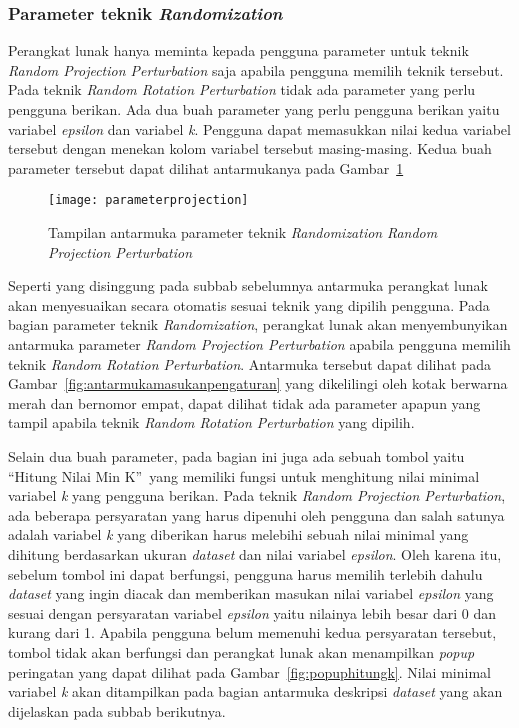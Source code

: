 \subsubsection{Parameter teknik \textit{Randomization}}
\label{subsubsec:parameterteknik}

Perangkat lunak hanya meminta kepada pengguna parameter untuk teknik \textit{Random Projection Perturbation} saja apabila pengguna memilih teknik tersebut. Pada teknik \textit{Random Rotation Perturbation} tidak ada parameter yang perlu pengguna berikan. Ada dua buah parameter yang perlu pengguna berikan yaitu variabel \textit{epsilon} dan variabel \textit{k}. Pengguna dapat memasukkan nilai kedua variabel tersebut dengan menekan kolom variabel tersebut masing-masing. Kedua buah parameter tersebut dapat dilihat antarmukanya pada Gambar~\ref{fig:parameterprojection}

\begin{figure}
	\centering
	\texttt{[image: parameterprojection]}
	\caption{Tampilan antarmuka parameter teknik \textit{Randomization} \textit{Random Projection Perturbation}}
	\label{fig:parameterprojection}
\end{figure}

Seperti yang disinggung pada subbab sebelumnya antarmuka perangkat lunak akan menyesuaikan secara otomatis sesuai teknik yang dipilih pengguna. Pada bagian parameter teknik \textit{Randomization}, perangkat lunak akan menyembunyikan antarmuka parameter \textit{Random Projection Perturbation} apabila pengguna memilih teknik \textit{Random Rotation Perturbation}. Antarmuka tersebut dapat dilihat pada Gambar~\ref{fig:antarmukamasukanpengaturan} yang dikelilingi oleh kotak berwarna merah dan bernomor empat, dapat dilihat tidak ada parameter apapun yang tampil apabila teknik \textit{Random Rotation Perturbation} yang dipilih.

Selain dua buah parameter, pada bagian ini juga ada sebuah tombol yaitu \textquotedblleft Hitung Nilai Min K\textquotedblright~yang memiliki fungsi untuk menghitung nilai minimal variabel \textit{k} yang pengguna berikan. Pada teknik \textit{Random Projection Perturbation}, ada beberapa persyaratan yang harus dipenuhi oleh pengguna dan salah satunya adalah variabel \textit{k} yang diberikan harus melebihi sebuah nilai minimal yang dihitung berdasarkan ukuran \textit{dataset} dan nilai variabel \textit{epsilon}. Oleh karena itu, sebelum tombol ini dapat berfungsi, pengguna harus memilih terlebih dahulu \textit{dataset} yang ingin diacak dan memberikan masukan nilai variabel \textit{epsilon} yang sesuai dengan persyaratan variabel \textit{epsilon} yaitu nilainya lebih besar dari 0 dan kurang dari 1. Apabila pengguna belum memenuhi kedua persyaratan tersebut, tombol tidak akan berfungsi dan perangkat lunak akan menampilkan \textit{popup} peringatan yang dapat dilihat pada Gambar~\ref{fig:popuphitungk}. Nilai minimal variabel \textit{k} akan ditampilkan pada bagian antarmuka deskripsi \textit{dataset} yang akan dijelaskan pada subbab berikutnya.

